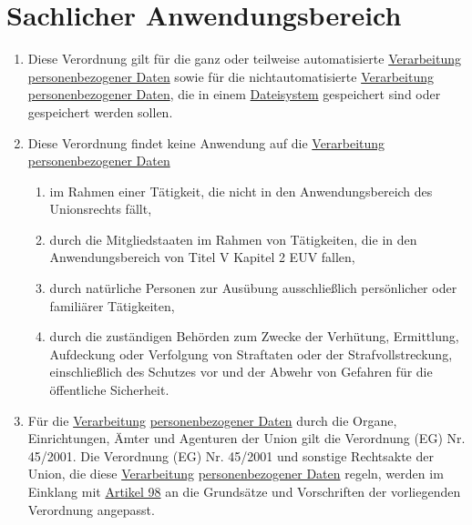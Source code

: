 \chapter{Sachlicher Anwendungsbereich}
\label{ch:2}


\begin{enumerate}

  \item Diese Verordnung gilt für die ganz oder teilweise automatisierte \hyperref[itm:04-2]{Verarbeitung} \hyperref
   [itm:04-1]{personenbezogener Daten} sowie für die nichtautomatisierte \hyperref[itm:04-2]{Verarbeitung} \hyperref
   [itm:04-1]{personenbezogener Daten}, die in einem \hyperref[itm:04-6]{Dateisystem} gespeichert sind oder gespeichert
   werden sollen.%
  \label{itm:02-1}

  \item Diese Verordnung findet keine Anwendung auf die \hyperref[itm:04-2]{Verarbeitung} \hyperref[itm:04-1]
   {personenbezogener Daten}%
  \label{itm:02-2}

  \begin{enumerate}
  
    \item im Rahmen einer Tätigkeit, die nicht in den Anwendungsbereich des Unionsrechts fällt,%
    \label{itm:02-2a}

    \item durch die Mitgliedstaaten im Rahmen von Tätigkeiten, die in den Anwendungsbereich von Titel V Kapitel 2
     EUV fallen,
    \label{itm:02-2b}

    \item durch natürliche Personen zur Ausübung ausschließlich persönlicher oder familiärer Tätigkeiten,%
    \label{itm:02-2c}

    \item durch die zuständigen Behörden zum Zwecke der Verhütung, Ermittlung, Aufdeckung oder Verfolgung von Straftaten
     oder der Strafvollstreckung, einschließlich des Schutzes vor und der Abwehr von Gefahren für die öffentliche
     Sicherheit.%
    \label{itm:02-2d}

  \end{enumerate}

  \item Für die \hyperref[itm:04-2]{Verarbeitung} \hyperref[itm:04-1]{personenbezogener Daten} durch die Organe,
   Einrichtungen, Ämter und Agenturen der Union gilt die Verordnung (EG) Nr. 45/2001. Die Verordnung (EG) Nr. 45/2001
   und sonstige Rechtsakte der Union, die diese \hyperref[itm:04-2]{Verarbeitung} \hyperref[itm:04-1]
   {personenbezogener Daten} regeln, werden im Einklang mit \hyperref[ch:98]{Artikel 98} an die Grundsätze und
   Vorschriften der vorliegenden Verordnung angepasst.%
  \label{itm:02-3}


\end{enumerate}
